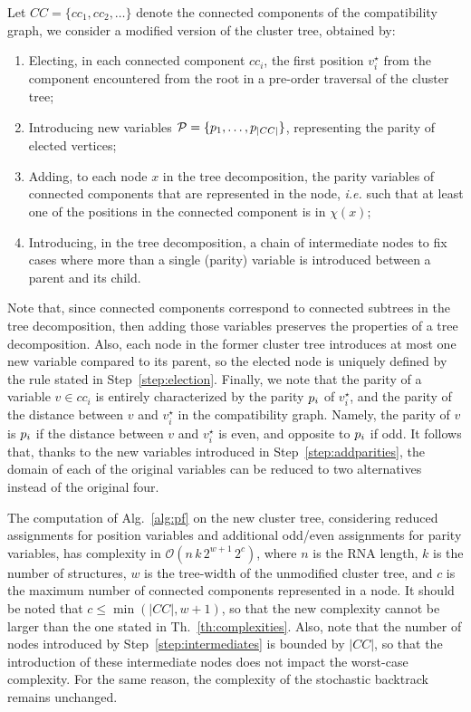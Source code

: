 \documentclass{bioinfo}
\begin{document}
Let $CC=\{cc_1,cc_2,\ldots\}$ denote the connected components of the compatibility graph, we consider a modified version of the cluster tree, obtained by:
\begin{enumerate}
\item Electing, in each connected component $cc_i$, the first position $v_i^\star$ from the component encountered from the root in a pre-order traversal of the cluster tree;\label{step:election}
\item Introducing new variables $\mathcal{P}=\{p_{1},\ldots,p_{|CC|}\}$, representing the parity of elected vertices;
\item Adding, to each node $x$ in the tree decomposition, the parity variables of connected components that are represented in the node, \emph{i.e.} such that at least one of the positions in the connected component is in $\chi(x)$; \label{step:addparities}
\item Introducing, in the tree decomposition, a chain of intermediate nodes to fix cases where more than a single (parity) variable is introduced between a parent and its child.\label{step:intermediates}
\end{enumerate}
Note that, since connected components correspond to connected subtrees in the tree decomposition, then adding those variables preserves the properties of a tree decomposition. Also, each node in the former cluster tree introduces at most one new variable compared to its parent, so the elected node is uniquely defined by the rule stated in Step~\ref{step:election}. Finally, we note that the parity of a variable $v\in cc_i$ is entirely characterized by the parity $p_{i}$ of $v_i^\star$, and the parity of the distance between $v$ and $v_i^\star$ in the compatibility graph. Namely, the parity of $v$ is $p_{i}$ if the distance between $v$ and $v^{\star}_i$ is even, and opposite to $p_{i}$ if odd. It follows that, thanks to the new variables introduced in Step~\ref{step:addparities}, the domain of each of the original variables can be reduced to two alternatives instead of the original four.

The computation of Alg.~\ref{alg:pf} on the new cluster tree, considering reduced assignments for position variables and additional odd/even assignments for parity variables, has complexity in $\mathcal{O}(n\,k\,2^{w+1}\,2^{c})$, where $n$ is the RNA length, $k$ is the number of structures, $w$ is the tree-width of the unmodified cluster tree, and $c$ is the maximum number of connected components represented in a node. It should be noted that $c\le \min(|CC|,w+1)$, so that the new complexity cannot be larger than the one stated in Th.~\ref{th:complexities}. Also, note that the number of nodes introduced by Step~\ref{step:intermediates} is bounded by $|CC|$, so that the introduction of these intermediate nodes does not impact the worst-case complexity. For the same reason, the complexity of the stochastic backtrack remains unchanged.
\end{document}
